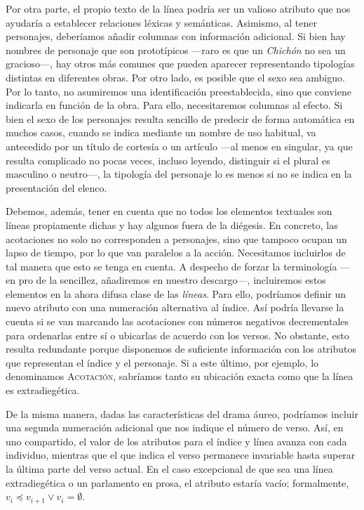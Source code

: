 Por otra parte, el propio texto de la línea podría ser un valioso atributo que nos ayudaría a establecer relaciones léxicas y semánticas. Asimismo, al tener personajes, deberíamos añadir columnas con información adicional. Si bien hay nombres de personaje que son prototípicos —raro es que un \textit{Chichón} no sea un gracioso—, hay otros más comunes que pueden aparecer representando tipologías distintas en diferentes obras. Por otro lado, es posible que el sexo sea ambiguo. Por lo tanto, no asumiremos una identificación preestablecida, sino que conviene indicarla en función de la obra. Para ello, necesitaremos columnas al efecto. Si bien el sexo de los personajes resulta sencillo de predecir de forma automática en muchos casos, cuando se indica mediante un nombre de uso habitual, va antecedido por un título de cortesía o un artículo —al menos en singular, ya que resulta complicado no pocas veces, incluso leyendo, distinguir si el plural es masculino o neutro—, la tipología del personaje lo es menos si no se indica en la presentación del elenco.

Debemos, además, tener en cuenta que no todos los elementos textuales son líneas propiamente dichas y hay algunos fuera de la diégesis. En concreto, las acotaciones no solo no corresponden a personajes, sino que tampoco ocupan un lapso de tiempo, por lo que van paralelos a la acción. Necesitamos incluirlos de tal manera que esto se tenga en cuenta. A despecho de forzar la terminología —en pro de la sencillez, añadiremos en nuestro descargo—, incluiremos estos elementos en la ahora difusa clase de las \textit{líneas}. Para ello, podríamos definir un nuevo atributo con una numeración alternativa al índice. Así podría llevarse la cuenta si se van marcando las acotaciones con números negativos decrementales para ordenarlas entre sí o ubicarlas de acuerdo con los versos. No obstante, esto resulta redundante porque disponemos de suficiente información con los atributos que representan el índice y el personaje. Si a este último, por ejemplo, lo denominamos \textsc{Acotación}, sabríamos tanto su ubicación exacta como que la línea es extradiegética. 

De la misma manera, dadas las características del drama áureo, podríamos incluir una segunda numeración adicional que nos indique el número de verso. Así, en uno compartido, el valor de los atributos para el índice y línea avanza con cada individuo, mientras que el que indica el verso permanece invariable hasta superar la última parte del verso actual. En el caso excepcional de que sea una línea extradiegética o un parlamento en prosa, el atributo estaría vacío; formalmente, $v_{i} \preceq v_{i+1} \vee v_{i} = \emptyset$.

